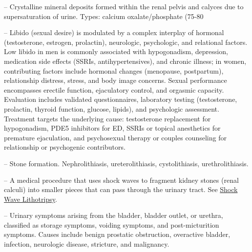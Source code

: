 -- Crystalline mineral deposits formed within the renal pelvis and calyces due to supersaturation of urine. Types: calcium oxalate/phosphate (75-80%

-- Libido (sexual desire) is modulated by a complex interplay of hormonal (testosterone, estrogen, prolactin), neurologic, psychologic, and relational factors. Low libido in men is commonly associated with hypogonadism, depression, medication side effects (SSRIs, antihypertensives), and chronic illness; in women, contributing factors include hormonal changes (menopause, postpartum), relationship distress, stress, and body image concerns. Sexual performance encompasses erectile function, ejaculatory control, and orgasmic capacity. Evaluation includes validated questionnaires, laboratory testing (testosterone, prolactin, thyroid function, glucose, lipids), and psychologic assessment. Treatment targets the underlying cause: testosterone replacement for hypogonadism, PDE5 inhibitors for ED, SSRIs or topical anesthetics for premature ejaculation, and psychosexual therapy or couples counseling for relationship or psychogenic contributors.

-- Stone formation. Nephrolithiasis, ureterolithiasis, cystolithiasis, urethrolithiasis.

-- A medical procedure that uses shock waves to fragment kidney stones (renal calculi) into smaller pieces that can pass through the urinary tract. See \hyperlink{Shock Wave Lithotripsy}{Shock Wave Lithotripsy}.

-- Urinary symptoms arising from the bladder, bladder outlet, or urethra, classified as storage symptoms, voiding symptoms, and post-micturition symptoms. Causes include benign prostatic obstruction, overactive bladder, infection, neurologic disease, stricture, and malignancy.

